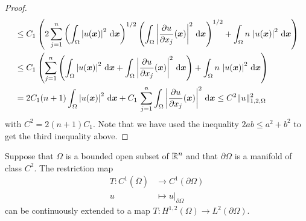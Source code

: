 \begin{proof}
\begin{align*}
&\leq C_1 \left( 2 \sum_{j=1}^n \left( \int_{\Omega}
\left|u({\bm{x}})\right|^2 \,\mathrm{d}{{\bm{x}}}\right)^{1/2}
\left( \int_{\Omega} \left|\frac{\partial{u}}{\partial x_j}({\bm{x}})\right|^2
\,\mathrm{d}{{\bm{x}}} \right)^{1/2}
+ \int_{\Omega} n\,\left|u({\bm{x}})\right|^2 \,\mathrm{d}{{\bm{x}}} \right) \\
&\leq C_1 \left( \sum_{j=1}^n \left( \int_{\Omega}
\left|u({\bm{x}})\right|^2 \,\mathrm{d}{{\bm{x}}} +
\int_{\Omega} \left|\frac{\partial{u}}{\partial x_j}({\bm{x}})\right|^2
\,\mathrm{d}{{\bm{x}}} \right)
+ \int_{\Omega} n\,\left|u({\bm{x}})\right|^2 \,\mathrm{d}{{\bm{x}}} \right) \\
&= 2 C_1 (n+1) \int_{\Omega} \left|u({\bm{x}})\right|^2 \,\mathrm{d}{{\bm{x}}}
+ C_1 \, \sum_{j=1}^n \int_{\Omega} \left|\frac{\partial{u}}{\partial x_j}({\bm{x}})\right|^2
\,\mathrm{d}{{\bm{x}}}
\leq C^2 \| u \|_{1,2,\Omega}^2
\end{align*}
with $\displaystyle C^2 = 2(n+1)C_1$.  Note that we have used the inequality
$\displaystyle 2ab \leq a^2+b^2$ to get the third inequality above.
\end{proof}

\begin{cor}
Suppose that $\Omega$ is a bounded open subset of $\displaystyle \mathbb{R}^n$ and that
$\partial \Omega$ is a manifold of class $\displaystyle C^2$.  The
restriction map
\begin{align*}
T:C^1(\overline{\Omega}) & \rightarrow C^1(\partial \Omega) \\
u &\mapsto u\big|_{\partial \Omega}
\end{align*}
can be continuously extended to a map
$\displaystyle T:H^{1,2}(\Omega) \rightarrow L^2(\partial \Omega)$.
\end{cor}

